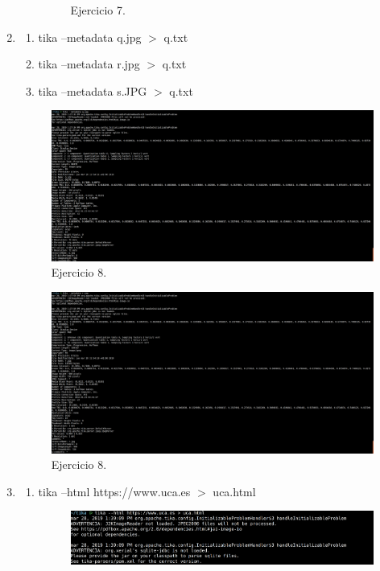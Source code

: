 \documentclass{article}
\begin{document}
\begin{enumerate}
\begin{enumerate}
\begin{figure}[H]
                \caption{Ejercicio 7.}
                \end{figure}
        \end{enumerate}
    \item
        \begin{enumerate}
            \item tika --metadata q.jpg $>$ q.txt
            \item tika --metadata r.jpg $>$ q.txt
            \item tika --metadata s.JPG $>$ q.txt
        \end{enumerate}
        \begin{figure}[H]
        \centering
        \includegraphics[width=0.7\linewidth]{./ej12}
        \caption{Ejercicio 8.}
        \end{figure}
        \begin{figure}[H]
        \centering
        \includegraphics[width=0.7\linewidth]{./ej13}
        \caption{Ejercicio 8.}
        \end{figure}
    \item
        \begin{enumerate}
            \item tika --html https://www.uca.es $>$ uca.html
                \begin{figure}[H]
                \centering
                \includegraphics[width=0.7\linewidth]{./ej14}

\end{figure}
\end{enumerate}
\end{enumerate}
\end{document}
